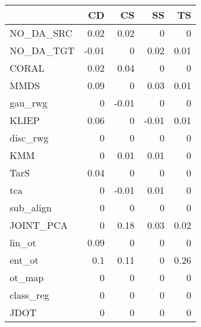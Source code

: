 \begin{tabular}{lrrrr}
\hline
           &    CD &    CS &    SS &   TS \\
\hline
 NO\_DA\_SRC &  0.02 &  0.02 &  0    & 0    \\
 NO\_DA\_TGT & -0.01 &  0    &  0.02 & 0.01 \\
 CORAL     &  0.02 &  0.04 &  0    & 0    \\
 MMDS      &  0.09 &  0    &  0.03 & 0.01 \\
 gau\_rwg   &  0    & -0.01 &  0    & 0    \\
 KLIEP     &  0.06 &  0    & -0.01 & 0.01 \\
 disc\_rwg  &  0    &  0    &  0    & 0    \\
 KMM       &  0    &  0.01 &  0.01 & 0    \\
 TarS      &  0.04 &  0    &  0    & 0    \\
 tca       &  0    & -0.01 &  0.01 & 0    \\
 sub\_align &  0    &  0    &  0    & 0    \\
 JOINT\_PCA &  0    &  0.18 &  0.03 & 0.02 \\
 lin\_ot    &  0.09 &  0    &  0    & 0    \\
 ent\_ot    &  0.1  &  0.11 &  0    & 0.26 \\
 ot\_map    &  0    &  0    &  0    & 0    \\
 class\_reg &  0    &  0    &  0    & 0    \\
 JDOT      &  0    &  0    &  0    & 0    \\
\hline
\end{tabular}
